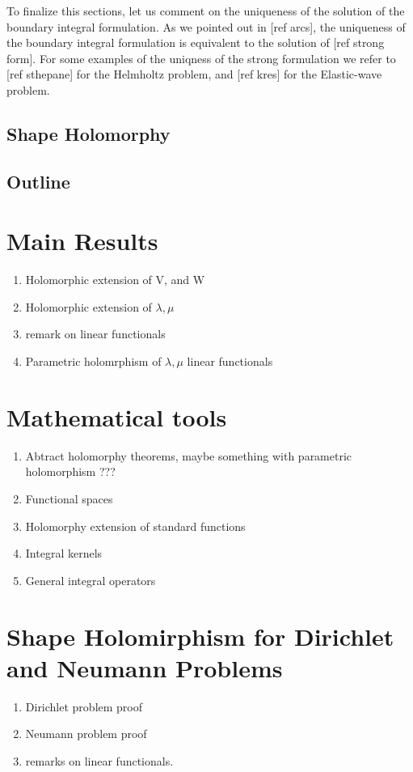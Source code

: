 \documentclass{article}
\newcommand{\todo}[1]{{\color{red}[#1]}}
\begin{document}
To finalize this sections, let us comment on the uniqueness of the solution of the boundary integral formulation. As we pointed out in \todo{ref arcs}, the uniqueness of the boundary integral formulation is equivalent to the solution of \todo{ref strong form}. For some examples of the uniqness of the strong formulation we refer to \todo{ref sthepane} for the Helmholtz problem, and \todo{ref kres} for the Elastic-wave problem.

\subsection{Shape Holomorphy}
\subsection{Outline}

\section{Main Results}
\begin{enumerate}
\item 
Holomorphic extension of V, and W
\item 
Holomorphic extension of $\lambda, \mu$
\item 
remark on linear functionals
\item 
Parametric holomrphism of $\lambda, \mu$
\remark 
linear functionals
\end{enumerate}

\section{Mathematical tools}
\begin{enumerate}
\item 
Abtract holomorphy theorems, maybe something with parametric holomorphism ???
\item 
Functional spaces
\item 
Holomorphy extension of standard functions 
\item 
Integral kernels 
\item 
General integral operators
\end{enumerate}

\section{Shape Holomirphism for Dirichlet and Neumann Problems}
\begin{enumerate}
\item 
Dirichlet problem proof
\item 
Neumann problem proof 
\item 
remarks on linear functionals.
\end{enumerate}
\end{document}
